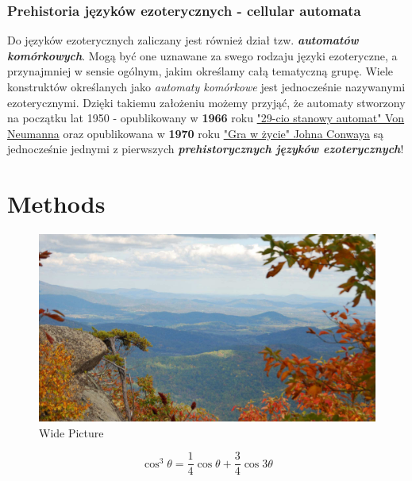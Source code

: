\documentclass[fleqn,10pt]{SelfArx} %
\begin{document}
\subsubsection{Prehistoria języków ezoterycznych - cellular automata}
Do języków ezoterycznych zaliczany jest również dział tzw. \textbf{\textit{automatów komórkowych}}.
Mogą być one uznawane za swego rodzaju języki ezoteryczne, a przynajmniej w sensie ogólnym, jakim określamy całą tematyczną grupę.
Wiele konstruktów określanych jako \textit{automaty komórkowe} jest jednocześnie nazywanymi ezoterycznymi.
Dzięki takiemu założeniu możemy przyjąć, że automaty stworzony na początku lat 1950 - opublikowany w \textbf{1966} roku \underline{"29-cio stanowy automat" Von Neumanna}
oraz opublikowana w \textbf{1970} roku \underline{"Gra w życie" Johna Conwaya} są jednocześnie jednymi z pierwszych \textbf{\textit{prehistorycznych języków ezoterycznych}}!





\section{Methods}

\begin{figure}[ht]\centering %
	\includegraphics[width=\linewidth]{view}
	\caption{Wide Picture}
	\label{fig:view}
\end{figure}

\lipsum[4] %

\begin{equation}
	\cos^3 \theta =\frac{1}{4}\cos\theta+\frac{3}{4}\cos 3\theta
	\label{eq:refname2}
\end{equation}
\end{document}
